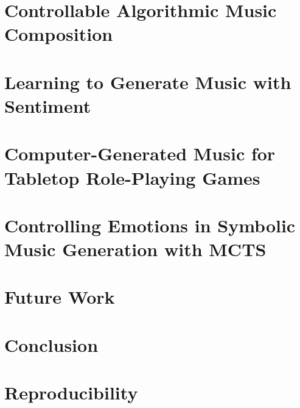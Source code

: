 \documentclass[11pt]{ucscthesis}
\begin{document}
\chapter{Controllable Algorithmic Music Composition}
\label{ch:related}


\chapter{Learning to Generate Music with Sentiment}
\label{ch:ismir19}


\chapter{Computer-Generated Music for Tabletop Role-Playing Games}
\label{ch:aiide20}


\chapter{Controlling Emotions in Symbolic Music Generation with MCTS}
\label{ch:ismir21}


\chapter{Future Work}
\label{ch:future}


\chapter{Conclusion}
\label{ch:conclusion}


\appendix
\chapter{Reproducibility}
\label{ch:appendix}




\def\baselinestretch{1.0}\large\normalsize

% 


\end{document}
